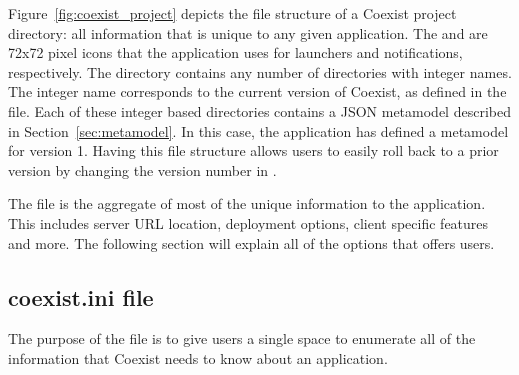 Figure~\ref{fig:coexist_project} depicts the file structure of a Coexist project
directory: all information that is unique to any given application. The
 and  are 72x72 pixel icons that the
application uses for launchers and notifications, respectively. The 
directory contains any number of directories with integer names. The integer
name corresponds to the current version of Coexist, as defined in the
 file. Each of these integer based directories contains a JSON
metamodel described in Section~\ref{sec:metamodel}. In this case, the
application has defined a metamodel for version 1. Having this file structure
allows users to easily roll back to a prior version by changing the version
number in . 

The  file is the aggregate of most of the unique information to
the application. This includes server URL location, deployment options, client
specific features and more. The following section will explain all of the
options that  offers users. 


\subsection{coexist.ini file}  \label{sec:ini}

The purpose of the  file is to give users a single space to
enumerate all of the information that Coexist needs to know about an
application. 


